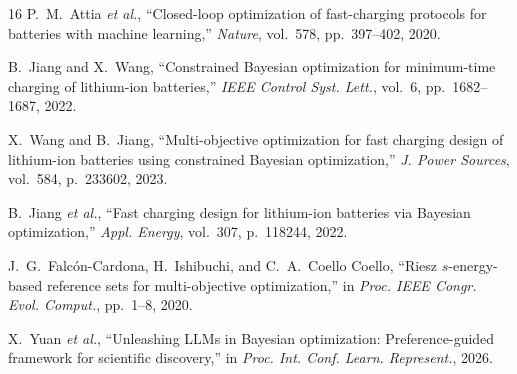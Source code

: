 \begin{thebibliography}{16}
P.~M.~Attia \textit{et al.}, ``Closed-loop optimization of fast-charging
protocols for batteries with machine learning,'' \textit{Nature}, vol.~578,
pp.~397--402, 2020.

B.~Jiang and X.~Wang, ``Constrained Bayesian optimization for minimum-time
charging of lithium-ion batteries,'' \textit{IEEE Control Syst. Lett.}, vol.~6,
pp.~1682--1687, 2022.

X.~Wang and B.~Jiang, ``Multi-objective optimization for fast charging design
of lithium-ion batteries using constrained Bayesian optimization,''
\textit{J. Power Sources}, vol.~584, p.~233602, 2023.

B.~Jiang \textit{et al.}, ``Fast charging design for lithium-ion batteries via
Bayesian optimization,'' \textit{Appl. Energy}, vol.~307, p.~118244, 2022.

J.~G.~Falc\'on-Cardona, H.~Ishibuchi, and C.~A.~Coello Coello, ``Riesz
$s$-energy-based reference sets for multi-objective optimization,'' in
\textit{Proc. IEEE Congr. Evol. Comput.}, pp.~1--8, 2020.

X.~Yuan \textit{et al.}, ``Unleashing LLMs in Bayesian optimization:
Preference-guided framework for scientific discovery,'' in \textit{Proc. Int.
Conf. Learn. Represent.}, 2026.

\end{thebibliography}
